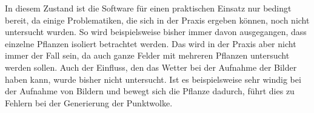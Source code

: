 \documentclass[12pt,titlepage, twoside]{article}
\begin{document}
In diesem Zustand ist die Software für einen praktischen Einsatz nur bedingt bereit, da einige Problematiken, die sich in der Praxis ergeben können, noch nicht untersucht wurden.
So wird beispielsweise bisher immer davon ausgegangen, dass einzelne Pflanzen isoliert betrachtet werden. Das wird in der Praxis aber nicht immer der Fall sein, da auch ganze Felder mit mehreren Pflanzen untersucht werden sollen.
Auch der Einfluss, den das Wetter bei der Aufnahme der Bilder haben kann, wurde bisher nicht untersucht. 
Ist es beispielsweise sehr windig bei der Aufnahme von Bildern und bewegt sich die Pflanze dadurch, führt dies zu Fehlern bei der Generierung der Punktwolke.

\newpage



\end{document}

